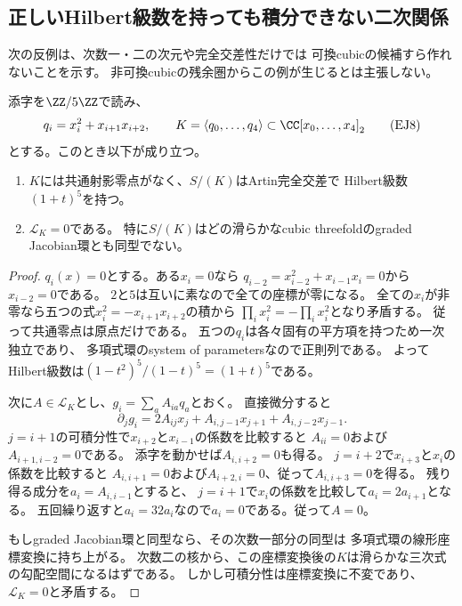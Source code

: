 \subsection{正しいHilbert級数を持っても積分できない二次関係}

次の反例は、次数一・二の次元や完全交差性だけでは
可換cubicの候補すら作れないことを示す。
非可換cubicの残余圏からこの例が生じるとは主張しない。

\begin{proposition}[五変数の積分不可能な完全交差]
\label{prop:ej-nonintegrable-ci}
添字を$\ZZ/5\ZZ$で読み、
\[
 q_i=x_i^2+x_{i+1}x_{i+2},\qquad
 K=\langle q_0,\ldots,q_4\rangle
 \subset\CC[x_0,\ldots,x_4]_2
 \tag{EJ8}\label{eq:ej-cycle-example}
\]
とする。このとき以下が成り立つ。
\begin{enumerate}
 \item $K$には共通射影零点がなく、$S/(K)$はArtin完全交差で
 Hilbert級数$(1+t)^5$を持つ。
 \item $\mathcal L_K=0$である。
 特に$S/(K)$はどの滑らかなcubic threefoldのgraded Jacobian環とも同型でない。
\end{enumerate}
\end{proposition}
\begin{proof}
$q_i(x)=0$とする。ある$x_i=0$なら
$q_{i-2}=x_{i-2}^2+x_{i-1}x_i=0$から$x_{i-2}=0$である。
$2$と$5$は互いに素なので全ての座標が零になる。
全ての$x_i$が非零なら五つの式$x_i^2=-x_{i+1}x_{i+2}$の積から
$\prod_i x_i^2=-\prod_i x_i^2$となり矛盾する。
従って共通零点は原点だけである。
五つの$q_i$は各々固有の平方項を持つため一次独立であり、
多項式環のsystem of parametersなので正則列である。
よってHilbert級数は$(1-t^2)^5/(1-t)^5=(1+t)^5$である。

次に$A\in\mathcal L_K$とし、$g_i=\sum_aA_{ia}q_a$とおく。
直接微分すると
\[
 \partial_jg_i=2A_{ij}x_j+A_{i,j-1}x_{j+1}+A_{i,j-2}x_{j-1}.
 \tag{EJ9}\label{eq:ej-cycle-derivative}
\]
$j=i+1$の可積分性で$x_{i+2}$と$x_{i-1}$の係数を比較すると
$A_{ii}=0$および$A_{i+1,i-2}=0$である。
添字を動かせば$A_{i,i+2}=0$も得る。
$j=i+2$で$x_{i+3}$と$x_i$の係数を比較すると
$A_{i,i+1}=0$および$A_{i+2,i}=0$、従って$A_{i,i+3}=0$を得る。
残り得る成分を$a_i=A_{i,i-1}$とすると、
$j=i+1$で$x_i$の係数を比較して$a_i=2a_{i+1}$となる。
五回繰り返すと$a_i=32a_i$なので$a_i=0$である。従って$A=0$。

もしgraded Jacobian環と同型なら、その次数一部分の同型は
多項式環の線形座標変換に持ち上がる。
次数二の核から、この座標変換後の$K$は滑らかな三次式の勾配空間になるはずである。
しかし可積分性は座標変換に不変であり、$\mathcal L_K=0$と矛盾する。
\end{proof}

